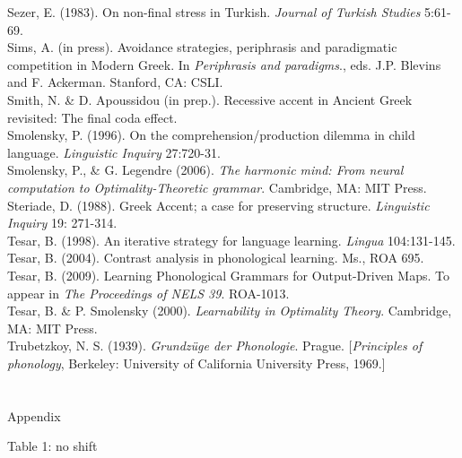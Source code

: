 \documentclass[a4paper]{article}
\begin{document}
Sezer, E. (1983). On non-final stress in Turkish. \textit{Journal of Turkish Studies} 5:61-69.\\\noindent
Sims, A. (in press). Avoidance strategies, periphrasis and paradigmatic competition in Modern Greek. In \textit{Periphrasis and paradigms}., eds. J.P. Blevins and F. Ackerman. Stanford, CA: CSLI.\\\noindent
Smith, N. \& D. Apoussidou (in prep.). Recessive accent in Ancient Greek revisited: The final coda effect.\\\noindent
Smolensky, P. (1996). On the comprehension/production dilemma in child language. \textit{Linguistic Inquiry }27:720-31.\\\noindent
Smolensky, P., \& G. Legendre (2006). \textit{The harmonic mind: From neural computation to Optimality-Theoretic grammar}. Cambridge, MA: MIT Press.\\\noindent
Steriade, D. (1988). Greek Accent; a case for preserving structure. \textit{Linguistic Inquiry }19: 271-314.\\\noindent
Tesar, B. (1998). An iterative strategy for language learning. \textit{Lingua} 104:131-145.\\\noindent
Tesar, B. (2004). Contrast analysis in phonological learning. Ms., ROA 695.\\\noindent
Tesar, B. (2009). Learning Phonological Grammars for Output-Driven Maps. To appear in \textit{The Proceedings of NELS 39}. ROA-1013.\\\noindent
Tesar, B. \& P. Smolensky (2000). \textit{Learnability in Optimality Theory}. Cambridge, MA: MIT Press.\\\noindent
Trubetzkoy, N. S. (1939). \textit{Grundzüge der Phonologie}. Prague. [\textit{Principles of phonology}, Berkeley: University of California University Press, 1969.]

\section{}Appendix

{
{Table 1: no shift}}
\end{document}
